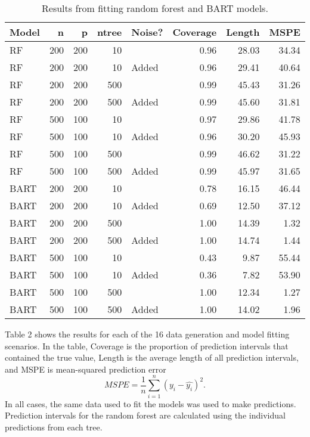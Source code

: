 \documentclass[12pt]{article}
\begin{document}
\begin{table}[ht]
\centering
\begin{tabular}{lrrrlrrr}
  \hline \hline
 Model & n & p & ntree & Noise? & Coverage & Length & MSPE \\ \hline
 RF   & 200 & 200 &  10 &       & 0.96 & 28.03 & 34.34 \\ 
 RF   & 200 & 200 &  10 & Added & 0.96 & 29.41 & 40.64 \\ 
 RF   & 200 & 200 & 500 &       & 0.99 & 45.43 & 31.26 \\ 
 RF   & 200 & 200 & 500 & Added & 0.99 & 45.60 & 31.81 \\ 
 RF   & 500 & 100 &  10 &       & 0.97 & 29.86 & 41.78 \\ 
 RF   & 500 & 100 &  10 & Added & 0.96 & 30.20 & 45.93 \\ 
 RF   & 500 & 100 & 500 &       & 0.99 & 46.62 & 31.22 \\ 
 RF   & 500 & 100 & 500 & Added & 0.99 & 45.97 & 31.65 \\ 
 BART & 200 & 200 &  10 &       & 0.78 & 16.15 & 46.44 \\ 
 BART & 200 & 200 &  10 & Added & 0.69 & 12.50 & 37.12 \\ 
 BART & 200 & 200 & 500 &       & 1.00 & 14.39 &  1.32 \\ 
 BART & 200 & 200 & 500 & Added & 1.00 & 14.74 &  1.44 \\ 
 BART & 500 & 100 &  10 &       & 0.43 &  9.87 & 55.44 \\ 
 BART & 500 & 100 &  10 & Added & 0.36 &  7.82 & 53.90 \\ 
 BART & 500 & 100 & 500 &       & 1.00 & 12.34 &  1.27 \\ 
 BART & 500 & 100 & 500 & Added & 1.00 & 14.02 &  1.96 \\ 
   \hline\hline
\end{tabular}
\caption{Results from fitting random forest and BART models.}
\end{table}

Table 2 shows the results for each of the 16 data generation and model fitting scenarios. In the table, Coverage is the proportion of prediction intervals that contained the true value, Length is the average length of all prediction intervals, and MSPE is mean-squared prediction error
\[ MSPE = \frac{1}{n}\sum_{i=1}^n(y_i-\hat{y_i})^2. \]
In all cases, the same data used to fit the models was used to make predictions. Prediction intervals for the random forest are calculated using the individual predictions from each tree.
\bigskip
\end{document}
